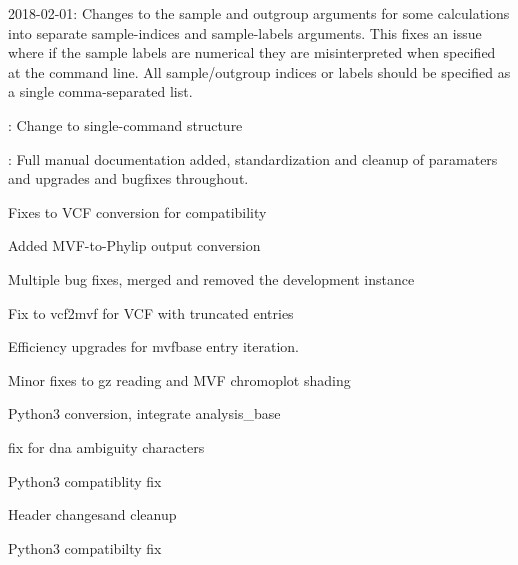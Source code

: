 \documentclass[letterpaper,11pt,english]{sphinxmanual}
\begin{document}
2018-02-01: Changes to the \textendash{}sample and \textendash{}outgroup arguments for some calculations into separate \textendash{}sample-indices and \textendash{}sample-labels arguments.  This fixes an issue where if the sample labels are numerical they are misinterpreted when specified at the command line. All sample/outgroup indices or labels should be specified as a single comma-separated list.


: Change to single-command structure


: Full manual documentation added, standardization and cleanup of paramaters and upgrades and bugfixes throughout.


Fixes to VCF conversion for compatibility


Added MVF-to-Phylip output conversion 


Multiple bug fixes, merged and removed the development instance


Fix to vcf2mvf for VCF with truncated entries


Efficiency upgrades for mvfbase entry iteration.


Minor fixes to gz reading and MVF chromoplot shading


Python3 conversion, integrate analysis\_base


fix for dna ambiguity characters


Python3 compatiblity fix


Header changesand cleanup


Python3 compatibilty fix
\end{document}
